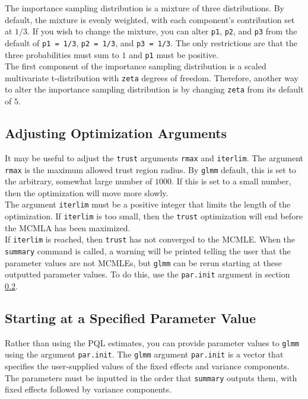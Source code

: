 \documentclass[11pt]{article}\usepackage[]{graphicx}\usepackage[]{color}
\begin{document}
The importance sampling distribution is a mixture of three distributions. By default, the mixture is evenly weighted, with each component's contribution set at $1/3$. If you wish to change the mixture, you can alter \texttt{p1}, \texttt{p2}, and \texttt{p3} from the default of  \texttt{p1 = 1/3}, \texttt{p2 = 1/3}, and \texttt{p3 = 1/3}. The only restrictions are that the three probabilities must sum to $1$ and \texttt{p1} must be positive.\\

 The first component of the importance sampling distribution is a scaled multivariate t-distribution with \texttt{zeta} degrees of freedom. Therefore, another way to alter the importance sampling distribution is by changing \texttt{zeta} from its default of $5$.\\

\subsection{Adjusting Optimization Arguments}
It may be useful to adjust the \texttt{trust} arguments \texttt{rmax} and \texttt{iterlim}. The argument \texttt{rmax} is the maximum allowed trust region radius. By \texttt{glmm} default, this is set to the arbitrary, somewhat large number of $1000$. If this is set to a small number, then the optimization will move more slowly.\\

The argument \texttt{iterlim} must be a positive integer that limits the length of the optimization. If \texttt{iterlim} is too small, then the \texttt{trust} optimization will end before the MCMLA has been maximized.\\

If \texttt{iterlim} is reached, then \texttt{trust} has not converged to the MCMLE. When the \texttt{summary} command is called, a warning will be printed telling the user that the parameter values are not MCMLEs, but \texttt{glmm} can be rerun starting at these  outputted parameter values. To do this, use the \texttt{par.init} argument in section \ref{sec:parinit}. \\

\subsection{Starting at a Specified Parameter Value}\label{sec:parinit}
Rather than using the PQL estimates, you can provide parameter values to \texttt{glmm} using the argument \texttt{par.init}. The \texttt{glmm} argument \texttt{par.init} is a vector that specifies the user-supplied values of the fixed effects and variance components. The parameters must be inputted in the order that \texttt{summary} outputs them, with fixed effects followed by variance components.\\
\end{document}
